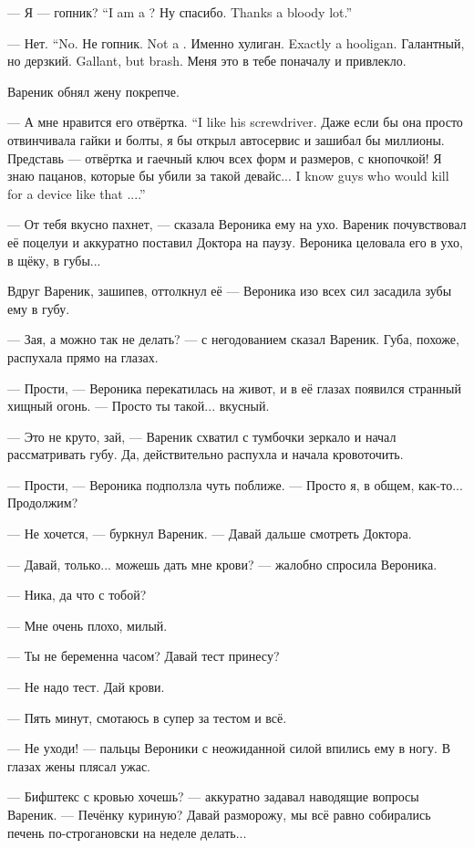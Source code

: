 {--- Я --- гопник?}
{``I am a \gopnik?}
{Ну спасибо.}
{Thanks a bloody lot.''}

{--- Нет.}
{``No.}
{Не гопник.}
{Not a \gopnik.}
{Именно хулиган.}
{Exactly a hooligan.}
{Галантный, но дерзкий.}
{Gallant, but brash.}
Меня это в тебе поначалу и привлекло.

Вареник обнял жену покрепче.

{--- А мне нравится его отвёртка.}
{``I like his screwdriver.}
Даже если бы она просто отвинчивала гайки и болты, я бы открыл автосервис и зашибал бы миллионы.
Представь --- отвёртка и гаечный ключ всех форм и размеров, с кнопочкой!
{Я знаю пацанов, которые бы убили за такой девайс...}
{I know guys who would kill for a device like that ....''}

--- От тебя вкусно пахнет, --- сказала Вероника ему на ухо.
Вареник почувствовал её поцелуи и аккуратно поставил Доктора на паузу.
Вероника целовала его в ухо, в щёку, в губы...

Вдруг Вареник, зашипев, оттолкнул её --- Вероника изо всех сил засадила зубы ему в губу.

--- Зая, а можно так не делать? --- с негодованием сказал Вареник.
Губа, похоже, распухала прямо на глазах.

--- Прости, --- Вероника перекатилась на живот, и в её глазах появился странный хищный огонь.
--- Просто ты такой... вкусный.

--- Это не круто, зай, --- Вареник схватил с тумбочки зеркало и начал рассматривать губу.
Да, действительно распухла и начала кровоточить.

--- Прости, --- Вероника подползла чуть поближе.
--- Просто я, в общем, как-то...
Продолжим?

--- Не хочется, --- буркнул Вареник.
--- Давай дальше смотреть Доктора.

--- Давай, только... можешь дать мне крови? --- жалобно спросила Вероника.

--- Ника, да что с тобой?

--- Мне очень плохо, милый.

--- Ты не беременна часом?
Давай тест принесу?

--- Не надо тест.
Дай крови.

--- Пять минут, смотаюсь в супер за тестом и всё.

--- Не уходи! --- пальцы Вероники с неожиданной силой впились ему в ногу.
В глазах жены плясал ужас.

--- Бифштекс с кровью хочешь? --- аккуратно задавал наводящие вопросы Вареник.
--- Печёнку куриную?
Давай разморожу, мы всё равно собирались печень по-строгановски на неделе делать...

